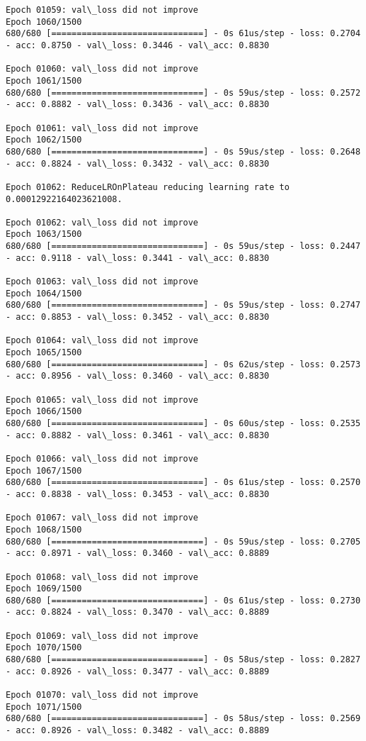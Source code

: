 \documentclass[11pt]{article}
\begin{document}
\begin{Verbatim}[commandchars=\\\{\}]
Epoch 01059: val\_loss did not improve
Epoch 1060/1500
680/680 [==============================] - 0s 61us/step - loss: 0.2704 - acc: 0.8750 - val\_loss: 0.3446 - val\_acc: 0.8830

Epoch 01060: val\_loss did not improve
Epoch 1061/1500
680/680 [==============================] - 0s 59us/step - loss: 0.2572 - acc: 0.8882 - val\_loss: 0.3436 - val\_acc: 0.8830

Epoch 01061: val\_loss did not improve
Epoch 1062/1500
680/680 [==============================] - 0s 59us/step - loss: 0.2648 - acc: 0.8824 - val\_loss: 0.3432 - val\_acc: 0.8830

Epoch 01062: ReduceLROnPlateau reducing learning rate to 0.00012922164023621008.

Epoch 01062: val\_loss did not improve
Epoch 1063/1500
680/680 [==============================] - 0s 59us/step - loss: 0.2447 - acc: 0.9118 - val\_loss: 0.3441 - val\_acc: 0.8830

Epoch 01063: val\_loss did not improve
Epoch 1064/1500
680/680 [==============================] - 0s 59us/step - loss: 0.2747 - acc: 0.8853 - val\_loss: 0.3452 - val\_acc: 0.8830

Epoch 01064: val\_loss did not improve
Epoch 1065/1500
680/680 [==============================] - 0s 62us/step - loss: 0.2573 - acc: 0.8956 - val\_loss: 0.3460 - val\_acc: 0.8830

Epoch 01065: val\_loss did not improve
Epoch 1066/1500
680/680 [==============================] - 0s 60us/step - loss: 0.2535 - acc: 0.8882 - val\_loss: 0.3461 - val\_acc: 0.8830

Epoch 01066: val\_loss did not improve
Epoch 1067/1500
680/680 [==============================] - 0s 61us/step - loss: 0.2570 - acc: 0.8838 - val\_loss: 0.3453 - val\_acc: 0.8830

Epoch 01067: val\_loss did not improve
Epoch 1068/1500
680/680 [==============================] - 0s 59us/step - loss: 0.2705 - acc: 0.8971 - val\_loss: 0.3460 - val\_acc: 0.8889

Epoch 01068: val\_loss did not improve
Epoch 1069/1500
680/680 [==============================] - 0s 61us/step - loss: 0.2730 - acc: 0.8824 - val\_loss: 0.3470 - val\_acc: 0.8889

Epoch 01069: val\_loss did not improve
Epoch 1070/1500
680/680 [==============================] - 0s 58us/step - loss: 0.2827 - acc: 0.8926 - val\_loss: 0.3477 - val\_acc: 0.8889

Epoch 01070: val\_loss did not improve
Epoch 1071/1500
680/680 [==============================] - 0s 58us/step - loss: 0.2569 - acc: 0.8926 - val\_loss: 0.3482 - val\_acc: 0.8889


\end{Verbatim}
\end{document}
